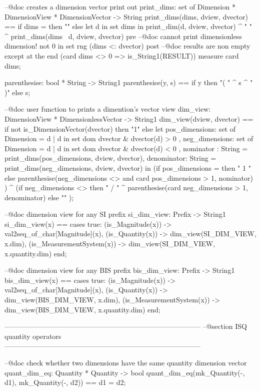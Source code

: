 \documentclass[a4paper]{article}
\begin{document}
\begin{vdm_al}
 --@doc creates a dimension vector print out  
 print_dims: set of Dimension * DimensionView * DimensionVector -> String 
 print_dims(dims, dview, dvector) ==
  if dims = {} then 
   ""
  else 
   let d in set dims in
    print_dim(d, dview, dvector) ^ " " ^ print_dims(dims \ {d}, dview, dvector)
 pre 
  --@doc cannot print dimensionless dimension!
  not 0 in set rng (dims <: dvector)
 post 
  --@doc results are non empty except at the end
  (card dims <> 0 => is_String1(RESULT))
 measure
  card dims;

 parenthesise: bool * String -> String1
 parenthesise(y, s) == if y then "( " ^ s ^ " )" else s;

 --@doc user function to prints a dimention's vector view 
 dim_view: DimensionView * DimensionlessVector -> String1
 dim_view(dview, dvector) == 
  if not is_DimensionVector(dvector) then 
   "1"
  else 
   let 
    pos_dimensions: set of Dimension = { d | d in set dom dvector & dvector(d) > 0 },
    neg_dimensions: set of Dimension = { d | d in set dom dvector & dvector(d) < 0 },
    nominator  : String = print_dims(pos_dimensions, dview, dvector),
    denominator: String = print_dims(neg_dimensions, dview, dvector)  
   in 
    (if pos_dimensions = {} then 
     " 1 " 
        else 
      parenthesise(neg_dimensions <> {} and card pos_dimensions > 1, nominator) 
    )
    ^ 
    (if neg_dimensions <> {} then 
     " / " ^ parenthesise(card neg_dimensions > 1, denominator) 
     else 
        ""
    );

 --@doc dimension view for any SI prefix
 si_dim_view: Prefix -> String1 
 si_dim_view(x) == 
  cases true:
   (is_Magnitude(x))         -> val2seq_of_char[Magnitude](x),
   (is_Quantity(x))          -> dim_view(SI_DIM_VIEW, x.dim),
   (is_MeasurementSystem(x)) -> dim_view(SI_DIM_VIEW, x.quantity.dim)
  end;

 --@doc dimension view for any BIS prefix
 bis_dim_view: Prefix -> String1 
 bis_dim_view(x) == 
  cases true:
   (is_Magnitude(x))         -> val2seq_of_char[Magnitude](x),
   (is_Quantity(x))          -> dim_view(BIS_DIM_VIEW, x.dim),
   (is_MeasurementSystem(x)) -> dim_view(BIS_DIM_VIEW, x.quantity.dim)
  end;

------------------------------------------------------------------------------------
--@section ISQ quantity operators
------------------------------------------------------------------------------------
        
 --@doc check whether two dimensions have the same quantity dimension vector
 quant_dim_eq: Quantity * Quantity -> bool
 quant_dim_eq(mk_Quantity(-, d1), mk_Quantity(-, d2)) == d1 = d2; 
            

\end{vdm_al}
\end{document}
